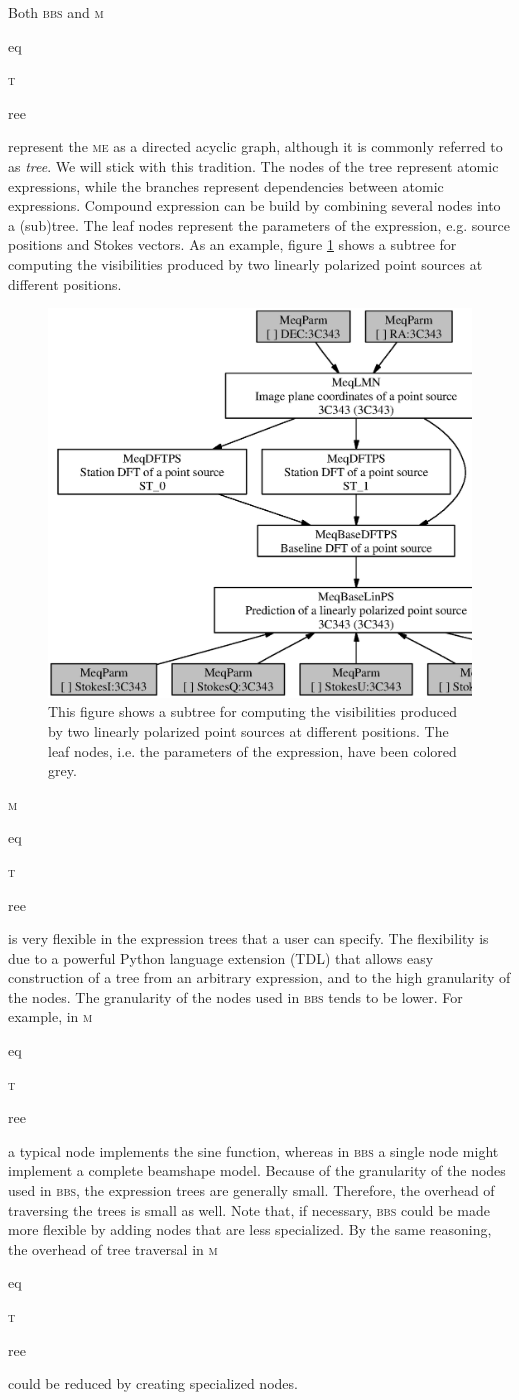 \documentclass[10pt]{lofar}
\newcommand{\bbs}{\textsc{bbs}\xspace}
\newcommand{\me}{\textsc{me}\xspace}
\newcommand{\meqtree}{\textsc{m}\begin{footnotesize}eq\end{footnotesize}\textsc{t}\begin{footnotesize}ree\end{footnotesize}\xspace}
\begin{document}
Both \bbs and \meqtree represent the \me as a directed acyclic graph, although it is commonly referred to as \emph{tree}. We will stick with this tradition. The nodes of the tree represent atomic expressions, while the branches represent dependencies between atomic expressions. Compound expression can be build by combining several nodes into a (sub)tree. The leaf nodes represent the parameters of the expression, e.g. source positions and Stokes vectors. As an example, figure \ref{fig:expr_tree} shows a subtree for computing the visibilities produced by two linearly polarized point sources at different positions.

\begin{figure}[htbp]
\label{fig:expr_tree}
\centering
\includegraphics[width=\textwidth]{images/expr_graph_sdd.ps}
\caption{This figure shows a subtree for computing the visibilities produced by two linearly polarized point sources at different positions. The leaf nodes, i.e. the parameters of the expression, have been colored grey.}
\end{figure}

\meqtree is very flexible in the expression trees that a user can specify. The flexibility is due to a powerful Python language extension (\textsc{TDL}) that allows easy construction of a tree from an arbitrary expression, and to the high granularity of the nodes. The granularity of the nodes used in \bbs tends to be lower. For example, in \meqtree a typical node implements the sine function, whereas in \bbs a single node might implement a complete beamshape model. Because of the granularity of the nodes used in \bbs, the expression trees are generally small. Therefore, the overhead of traversing the trees is small as well. Note that, if necessary, \bbs could be made more flexible by adding nodes that are less specialized. By the same reasoning, the overhead of tree traversal in \meqtree could be reduced by creating specialized nodes.
\end{document}
